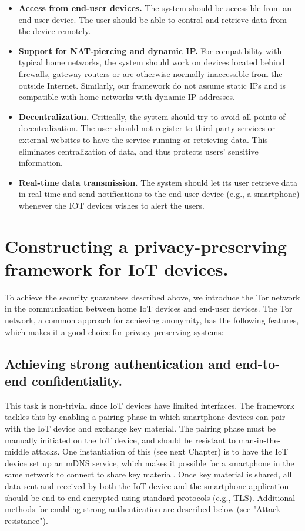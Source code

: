 \begin{itemize}
	\item \textbf{Access from end-user devices.} The system should be accessible from an end-user device. The user should be able to control and retrieve data from the device remotely. 
	\item \textbf{Support for NAT-piercing and dynamic IP.}  For compatibility with typical home networks, the system should work on devices located behind firewalls, gateway routers or are otherwise normally inaccessible from the outside Internet. Similarly, our framework do not assume static IPs and is compatible with home networks with dynamic IP addresses.
	\item \textbf{Decentralization.} Critically, the system should try to avoid all points of decentralization. The user should not register to third-party services or external websites to have the service running or retrieving data. This eliminates centralization of data, and thus protects users' sensitive information.
	\item \textbf{Real-time data transmission.} The system should let its user retrieve data in real-time and send notifications to the end-user device (e.g., a smartphone) whenever the IOT devices wishes to alert the users.
\end{itemize}



\section{Constructing a privacy-preserving framework for IoT devices.}
To achieve the security guarantees described above, we introduce the Tor network in the communication between home IoT devices and end-user devices. The Tor network, a common approach for achieving anonymity\cite{dingledine2004tor}, has the following features, which makes it a good choice for privacy-preserving systems:


\subsection{Achieving strong authentication and end-to-end confidentiality.} This task is non-trivial since IoT devices have limited interfaces. The framework tackles this by enabling a pairing phase in which smartphone devices can pair with the IoT device and exchange key material. The pairing phase must be manually initiated on the IoT device, and should be resistant to man-in-the-middle attacks. One instantiation of this (see next Chapter) is to have the IoT device set up an mDNS service, which makes it possible for a smartphone in the same network to connect to share key material. Once key material is shared, all data sent and received by both the IoT device and the smartphone application should be end-to-end encrypted using standard protocols (e.g., TLS). Additional methods for enabling strong authentication are described below (see "Attack resistance").

